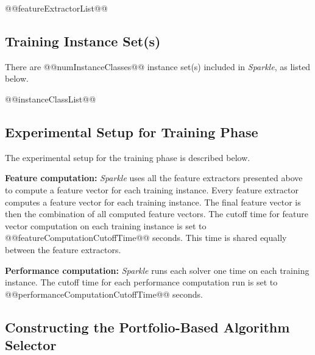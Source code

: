 \documentclass[british]{article}
\newif\iftest
\begin{document}
\begin{enumerate}
@@featureExtractorList@@
\end{enumerate}

\subsection{Training Instance Set(s)}
\label{sec:Train_Instance_Sets}
There are @@numInstanceClasses@@ instance set(s) included in \emph{Sparkle}, as listed below.

\begin{enumerate}
@@instanceClassList@@
\end{enumerate}

\iftest
\subsection{Test Instance Set}
\label{sec:Test_Instance_Set}

\begin{itemize}
\item @@testInstanceClass@@, consisting of @@numInstanceInTestInstanceClass@@ instances
\end{itemize}
\fi

\subsection{Experimental Setup for Training Phase}
\label{sec:Experimental_Setup_for_Training_Phase}

The experimental setup for the training phase is described below.

\textbf{Feature computation:} \emph{Sparkle} uses all the feature extractors presented above to compute a feature vector for each training instance. Every feature extractor computes a feature vector for each training instance. The final feature vector is then the combination of all computed feature vectors. The cutoff time for feature vector computation on each training instance is set to @@featureComputationCutoffTime@@ seconds. This time is shared equally between the feature extractors.

\textbf{Performance computation:} \emph{Sparkle} runs each solver one time on each training instance. The cutoff time for each performance computation run is set to @@performanceComputationCutoffTime@@ seconds.

\subsection{Constructing the Portfolio-Based Algorithm Selector}
\label{sec:Portfolio}
\end{document}
